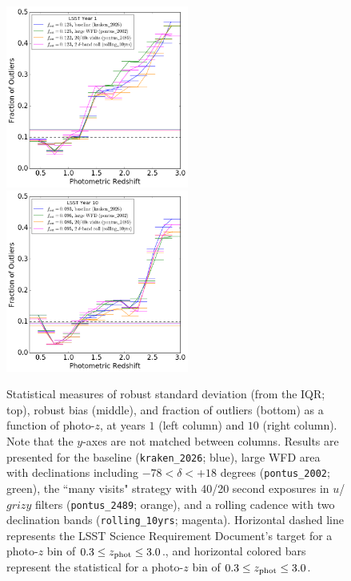 \begin{figure}
\begin{center}
\includegraphics[width=6cm,trim={0cm 0cm 0cm 0cm},clip]{figures/year1_fout.png}
\includegraphics[width=6cm,trim={0cm 0cm 0cm 0cm},clip]{figures/year10_fout.png}
\caption{\small{Statistical measures of robust standard deviation (from the IQR; top), robust bias (middle), and fraction of outliers (bottom) as a function of photo-$z$, at years $1$ (left column) and $10$ (right column). Note that the $y$-axes are not matched between columns. Results are presented for the baseline ({\tt kraken\_2026}; blue), large WFD area with declinations including  $-78<\delta<+18$ degrees ({\tt pontus\_2002}; green), the ``many visits" strategy with 40/20 second exposures in $u$/$grizy$ filters ({\tt pontus\_2489}; orange), and a rolling cadence with two declination bands ({\tt rolling\_10yrs}; magenta). Horizontal dashed line represents the LSST Science Requirement Document's target for a photo-$z$ bin of $0.3 \leq z_{\rm phot} \leq 3.0$., and horizontal colored bars represent the statistical for a photo-$z$ bin of $0.3 \leq z_{\rm phot} \leq 3.0$.} \label{fig:stats_opsim}}
\end{center}
\end{figure}

